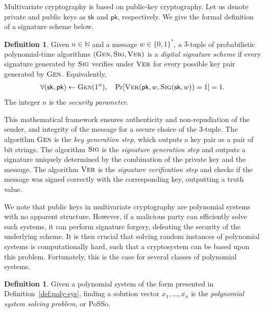 \documentclass[english]{ufsc-thesis-rn46-2019/ufsc-thesis-rn46-2019}
\theoremstyle{definition}
\newtheorem{definition}[theorem]{Definition}
\begin{document}
Multivariate cryptography is based on public-key cryptography. Let us denote
private and public keys as $\mathsf{sk}$ and $\mathsf{pk}$, respectively. We
give the formal definition of a signature scheme below.

\begin{definition}
  Given $n \in \mathbb{N}$ and a message $w \in {\{0, 1\}}^{*}$, a $3$-tuple of
  probabilistic polynomial-time algorithms
  $(\textsc{Gen}, \textsc{Sig}, \textsc{Ver})$ is a \emph{digital signature
  scheme} if every signature generated by $\textsc{Sig}$ verifies under
  $\textsc{Ver}$ for every possible key pair generated by $\textsc{Gen}$.
  Equivalently,
  \begin{align}
    \forall (\mathsf{sk}, \mathsf{pk}) \leftarrow \textsc{Gen}(1^{n}), \quad
      \Pr[\textsc{Ver}(\mathsf{pk}, w, \textsc{Sig}(\mathsf{sk}, w)) = 1] = 1.
  \end{align}
  The integer $n$ is the \emph{security parameter}.
\end{definition}

This mathematical framework ensures authenticity and non-repudiation of the
sender, and integrity of the message for a secure choice of the $3$-tuple. The
algorithm $\textsc{Gen}$ is the \emph{key generation step}, which outputs a key
pair as a pair of bit strings. The algorithm $\textsc{Sig}$ is the
\emph{signature generation step} and outputs a signature uniquely determined by
the combination of the private key and the message. The algorithm
$\textsc{Ver}$ is the \emph{signature verification step} and checks if the
message was signed correctly with the corresponding key, outputting a truth
value.

We note that public keys in multivariate cryptography are polynomial systems
with no apparent structure. However, if a malicious party can efficiently solve
such systems, it can perform signature forgery, defeating the security of the
underlying scheme. It is then crucial that solving random instances of
polynomial systems is computationally hard, such that a cryptosystem can be
based upon this problem. Fortunately, this is the case for several classes of
polynomial systems.

\begin{definition}\label{def:posso}
  Given a polynomial system of the form presented in
  Definition~\ref{def:poly-sys}, finding a solution vector
  $x_{1}, \dots, x_{n}$ is the \emph{polynomial system solving problem}, or
  \textsf{PoSSo}.
\end{definition}
\end{document}
